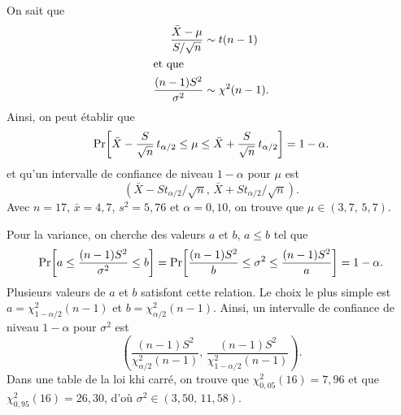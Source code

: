 \begin{solution}{5.4}
    On sait que
    \begin{align*}
      \frac{\bar{X} - \mu}{S/\sqrt{n}} &\sim t(n-1) \\
      \intertext{et que}
      \frac{(n-1) S^2}{\sigma^2} &\sim \chi^2(n - 1).
    \end{align*}
    Ainsi, on peut établir que
    \begin{equation*}
      \mathrm{Pr}\! \left[ \bar{X} - \frac{S}{\sqrt{n}}\, t_{\alpha/2} \leq \mu
        \leq \bar{X} + \frac{S}{\sqrt{n}}\, t_{\alpha/2} \right] = 1 - \alpha.
    \end{equation*}
    et qu'un intervalle de confiance de niveau $1 - \alpha$ pour $\mu$
    est
    \begin{equation*}
      (\bar{X} - S t_{\alpha/2}/\sqrt{n}, \,
      \bar{X} + S t_{\alpha/2}/\sqrt{n}).
    \end{equation*}
    Avec $n = 17$, $\bar{x} = 4,7$, $s^2 = 5,76$ et $\alpha = 0,10$,
    on trouve que $\mu \in (3,7, \, 5,7)$.

    Pour la variance, on cherche des valeurs $a$ et $b$, $a \leq b$
    tel que
    \begin{equation*}
      \mathrm{Pr}\! \left[ a \leq \frac{(n-1)S^2}{\sigma^2} \leq b \right] =
      \mathrm{Pr}\! \left[ \frac{(n-1)S^2}{b} \leq \sigma^2 \leq \frac{(n-1)S^2}{a} \right] =
      1 - \alpha.
    \end{equation*}
    Plusieurs valeurs de $a$ et $b$ satisfont cette relation. Le choix
    le plus simple est $a = \chi_{1 - \alpha/2}^2(n - 1)$ et $b =
    \chi_{\alpha/2}^2(n - 1)$. Ainsi, un intervalle de confiance de
    niveau $1 - \alpha$ pour $\sigma^2$ est
    \begin{equation*}
      \left(
        \frac{(n-1)S^2}{\chi_{\alpha/2}^2(n - 1)}, \,
        \frac{(n-1)S^2}{\chi_{1 - \alpha/2}^2(n - 1)}
      \right).
    \end{equation*}
    Dans une table de la loi khi carré, on trouve que
    $\chi_{0,05}^2(16) = 7,96$ et que $\chi_{0,95}^2(16) = 26,30$,
    d'où $\sigma^2 \in (3,50, \, 11,58)$.
  
\end{solution}
